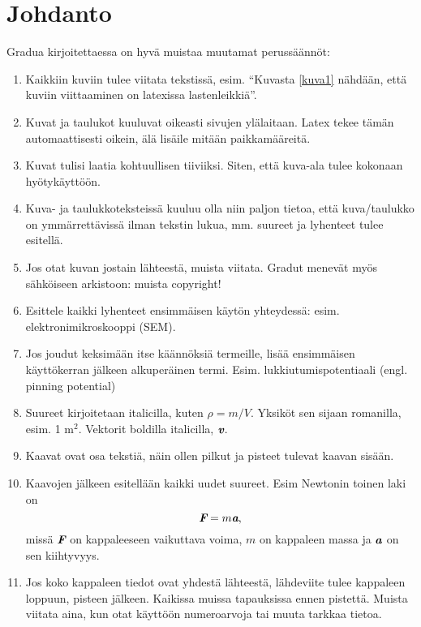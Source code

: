   \section*{Johdanto}
  
  Gradua kirjoitettaessa on hyvä muistaa muutamat perussäännöt:
  \begin{enumerate}
  \item Kaikkiin
  kuviin tulee viitata tekstissä, esim. ``Kuvasta \ref{kuva1} nähdään,
  että kuviin viittaaminen on latexissa lastenleikkiä''.
  \item Kuvat ja taulukot kuuluvat oikeasti sivujen ylälaitaan. Latex
    tekee tämän automaattisesti oikein, älä lisäile mitään paikkamääreitä.
  \item Kuvat tulisi laatia kohtuullisen tiiviiksi. Siten, että kuva-ala
    tulee kokonaan hyötykäyttöön.
  \item Kuva- ja taulukkoteksteissä kuuluu olla niin paljon tietoa, että
    kuva/taulukko on ymmärrettävissä ilman tekstin lukua, mm. suureet ja
    lyhenteet tulee esitellä.
  \item Jos otat kuvan jostain lähteestä, muista viitata. Gradut menevät
    myös sähköiseen arkistoon: muista copyright!
  \item Esittele kaikki lyhenteet ensimmäisen käytön yhteydessä:
    esim. elektronimikroskooppi (SEM).
  \item Jos joudut keksimään itse käännöksiä termeille, lisää
    ensimmäisen käyttökerran jälkeen alkuperäinen
    termi. Esim. lukkiutumispotentiaali (engl. pinning potential)
  \item Suureet kirjoitetaan italicilla, kuten $\rho = m/V$. Yksiköt sen
    sijaan romanilla, esim. 1 m$^2$. Vektorit boldilla italicilla,
    $\textbf{\em v}$.
  \item Kaavat ovat osa tekstiä, näin ollen pilkut ja pisteet tulevat
    kaavan sisään.
  \item Kaavojen jälkeen esitellään kaikki uudet suureet. Esim Newtonin
    toinen laki on 
  \begin{equation}
  \textbf{\em F} = m\textbf{\em a},
  \end{equation}
  missä $\textbf{\em F}$ on kappaleeseen vaikuttava voima, $m$ on kappaleen
  massa ja $\textbf{\em a}$ on sen kiihtyvyys.
  \item Jos koko kappaleen tiedot ovat yhdestä lähteestä, lähdeviite
    tulee kappaleen loppuun, pisteen jälkeen. Kaikissa muissa
    tapauksissa ennen pistettä. Muista viitata aina, kun otat käyttöön 
    numeroarvoja tai muuta tarkkaa tietoa.
  \end{enumerate}
  
